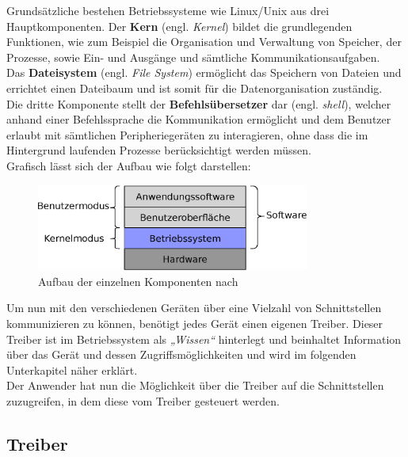Grundsätzliche bestehen Betriebssysteme wie Linux/Unix aus drei Hauptkomponenten.
Der \textbf{Kern} (engl. \emph{Kernel}) bildet die grundlegenden Funktionen, wie
zum Beispiel die Organisation und Verwaltung von Speicher, der Prozesse, sowie
Ein- und Ausgänge und sämtliche Kommunikationsaufgaben.\\
Das \textbf{Dateisystem} (engl. \emph{File System}) ermöglicht das Speichern von Dateien
und errichtet einen Dateibaum und ist somit für die Datenorganisation zuständig.\\
Die dritte Komponente stellt der \textbf{Befehlsübersetzer} dar (engl. \emph{shell}),
welcher anhand einer Befehlssprache die Kommunikation ermöglicht und dem Benutzer erlaubt
mit sämtlichen Peripheriegeräten zu interagieren, ohne dass die im Hintergrund laufenden
Prozesse berücksichtigt werden müssen. \cite{ubuntu}\\

Grafisch lässt sich der Aufbau wie folgt darstellen:\\

\begin{figure}[h!]
\centering
\includegraphics[width=0.8\textwidth]{Hauptteil/bs.eps}
\caption{Aufbau der einzelnen Komponenten nach \cite{mbs}}
\label{fig:mbs}
\end{figure}

Um nun mit den verschiedenen Geräten über eine Vielzahl von Schnittstellen kommunizieren
zu können, benötigt jedes Gerät einen eigenen Treiber. Dieser Treiber ist im Betriebssystem
als \emph{„Wissen“} hinterlegt und beinhaltet Information über das Gerät und dessen
Zugriffsmöglichkeiten und wird im folgenden Unterkapitel näher erklärt. \cite{treiber}\\
Der Anwender hat nun die Möglichkeit über die Treiber auf die Schnittstellen zuzugreifen, in dem diese vom
Treiber gesteuert werden.

\subsection{Treiber}\label{kap:treiber}


